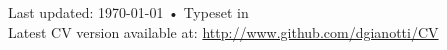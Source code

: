 \documentclass[10pt, a4paper]{article}
\begin{document}
\vfill{}

\begin{center}
{\scriptsize  Last updated: \today\- •\- 
Typeset in \href{http://nitens.org/taraborelli/cvtex}{
\XeTeX }\\
Latest CV version available at: \href{http://www.github.com/dgianotti/CV}{http://www.github.com/dgianotti/CV}}
\end{center}
\end{document}
